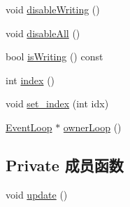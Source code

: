 \begin{DoxyCompactItemize}
\item 
void \hyperlink{classmuduo_1_1Channel_a97cbc4c0678234e62a4a9d906e064cdf}{disable\+Writing} ()
\item 
void \hyperlink{classmuduo_1_1Channel_a238885c747f586049b766fa4fcd5ec12}{disable\+All} ()
\item 
bool \hyperlink{classmuduo_1_1Channel_a181a6a67a97d760db63a2c3294ed22e3}{is\+Writing} () const
\item 
int \hyperlink{classmuduo_1_1Channel_a019749328da42c4814af71d3e3b647ad}{index} ()
\item 
void \hyperlink{classmuduo_1_1Channel_ac9a4cd0efc3148a6fee45b2ab4f61cb6}{set\+\_\+index} (int idx)
\item 
\hyperlink{classmuduo_1_1EventLoop}{Event\+Loop} $\ast$ \hyperlink{classmuduo_1_1Channel_a2e24e2ab7ada4682fdf49cc835d85e8d}{owner\+Loop} ()
\end{DoxyCompactItemize}
\subsection*{Private 成员函数}
\begin{DoxyCompactItemize}
\item 
void \hyperlink{classmuduo_1_1Channel_ac5c54df7ed3b930268c8d7752c101725}{update} ()
\end{DoxyCompactItemize}
